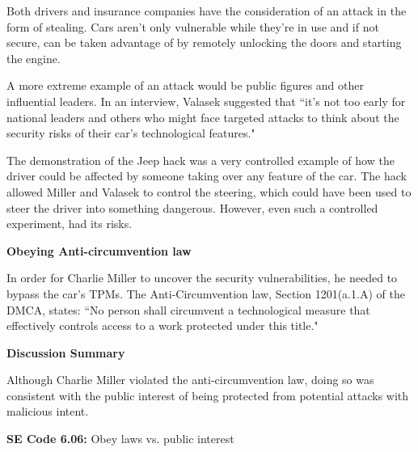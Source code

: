 \documentclass[12pt]{article}
\begin{document}
\begin{multicols}{2}
Both drivers and insurance companies have the consideration of an attack in the form of stealing. Cars aren't only vulnerable while they're in use and if not secure, can be taken advantage of by remotely unlocking the doors and starting the engine. \cite{hackingRisk}

A more extreme example of an attack would be public figures and other influential leaders. In an interview, Valasek suggested that ``it's not too early for national leaders and others who might face targeted attacks to think about the security risks of their car's technological features."\cite{hackingRisk}

The demonstration of the Jeep hack was a very controlled example of how the driver could be affected by someone taking over any feature of the car. The hack allowed Miller and Valasek to control the steering\cite{wired}, which could have been used to steer the driver into something dangerous. However, even such a controlled experiment, had its risks. 



\vspace{.5cm}\hspace{-.5cm}\textbf{Obeying Anti-circumvention law }\vspace{.2cm}

In order for Charlie Miller to uncover the security vulnerabilities, he needed to bypass the car's TPMs. \cite{brokeDMCA} The Anti-Circumvention law, Section 1201(a.1.A) of the DMCA, states: ``No person shall circumvent a technological measure that effectively controls access to a work protected under this title."\cite{DMCA}



\vspace{.5cm}\hspace{-.5cm}\textbf{Discussion Summary}\vspace{.2cm}

Although Charlie Miller violated the anti-circumvention law, doing so was consistent with the public interest of being protected from potential attacks with malicious intent.

\begin{framed}
\hspace{-.5cm}\textbf{SE Code 6.06:} Obey laws vs. public interest


\end{framed}
\end{multicols}
\end{document}
